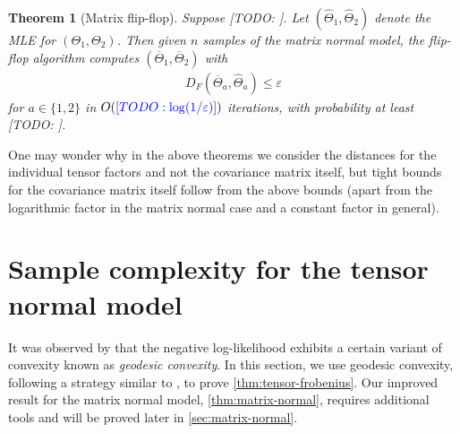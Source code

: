 \documentclass[aos]{imsart}
\newtheorem{theorem}{Theorem}[section]
\theoremstyle{definition}
\numberwithin{equation}{section}
\newcommand{\eps}{\varepsilon}
\newcommand{\TODO}[1]{{\color{blue}[TODO: #1]}}
\begin{document}
\begin{theorem}[Matrix flip-flop]\label{thm:matrix-flipflop}
Suppose \TODO{}.
Let $(\widehat{\Theta}_1,\widehat{\Theta}_2)$ denote the MLE for $(\Theta_1,\Theta_2)$.
Then given $n$ samples of the matrix normal model, the flip-flop algorithm computes $(\overline{\Theta}_1,\overline{\Theta}_2)$ with
\begin{align*}
  D_F(\overline{\Theta}_a, \widehat{\Theta}_a) \leq \eps
\end{align*}
for $a\in\{1,2\}$ in $O(\TODO{\log(1/\eps)})$ iterations, with probability at least \TODO{}.
\end{theorem}

One may wonder why in the above theorems we consider the distances for the individual tensor factors and not the covariance matrix itself, but tight bounds for the covariance matrix itself follow from the above bounds (apart from the logarithmic factor in the matrix normal case and a constant factor in general).


\section{Sample complexity for the tensor normal model}\label{sec:tensor-normal}
It was observed by \cite{wiesel2012geodesic} that the negative log-likelihood exhibits a certain variant of convexity known as \emph{geodesic convexity}.
In this section, we use geodesic convexity, following a strategy similar to \cite{FM20}, to prove \cref{thm:tensor-frobenius}.
Our improved result for the matrix normal model, \cref{thm:matrix-normal}, requires additional tools and will
be proved later in \cref{sec:matrix-normal}.

\end{document}
